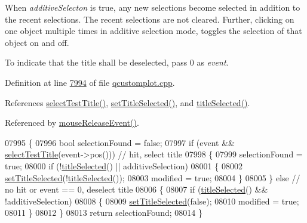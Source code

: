 When {\itshape additive\+Selecton} is true, any new selections become selected in addition to the recent selections. The recent selections are not cleared. Further, clicking on one object multiple times in additive selection mode, toggles the selection of that object on and off.

To indicate that the title shall be deselected, pass 0 as {\itshape event}. 

Definition at line \hyperlink{a00115_source_l07994}{7994} of file \hyperlink{a00115_source}{qcustomplot.\+cpp}.



References \hyperlink{a00115_source_l08129}{select\+Test\+Title()}, \hyperlink{a00115_source_l06382}{set\+Title\+Selected()}, and \hyperlink{a00116_source_l01979}{title\+Selected()}.



Referenced by \hyperlink{a00115_source_l07691}{mouse\+Release\+Event()}.


\begin{DoxyCode}
07995 \{
07996   \textcolor{keywordtype}{bool} selectionFound = \textcolor{keyword}{false};
07997   \textcolor{keywordflow}{if} (event && \hyperlink{a00116_a2a2d01a092840ac01b16104f7973f831}{selectTestTitle}(event->pos())) \textcolor{comment}{// hit, select title}
07998   \{
07999     selectionFound = \textcolor{keyword}{true};
08000     \textcolor{keywordflow}{if} (!\hyperlink{a00116_a23f3f4b312d1d78837f2a3602792d8e3}{titleSelected}() || additiveSelection)
08001     \{
08002       \hyperlink{a00116_aa89e06c04804ff2a0994ccb1aa80d131}{setTitleSelected}(!\hyperlink{a00116_a23f3f4b312d1d78837f2a3602792d8e3}{titleSelected}());
08003       modified = \textcolor{keyword}{true};
08004     \}
08005   \} \textcolor{keywordflow}{else} \textcolor{comment}{// no hit or event == 0, deselect title}
08006   \{
08007     \textcolor{keywordflow}{if} (\hyperlink{a00116_a23f3f4b312d1d78837f2a3602792d8e3}{titleSelected}() && !additiveSelection)
08008     \{
08009       \hyperlink{a00116_aa89e06c04804ff2a0994ccb1aa80d131}{setTitleSelected}(\textcolor{keyword}{false});
08010       modified = \textcolor{keyword}{true};
08011     \}
08012   \}
08013   \textcolor{keywordflow}{return} selectionFound;
08014 \}
\end{DoxyCode}


